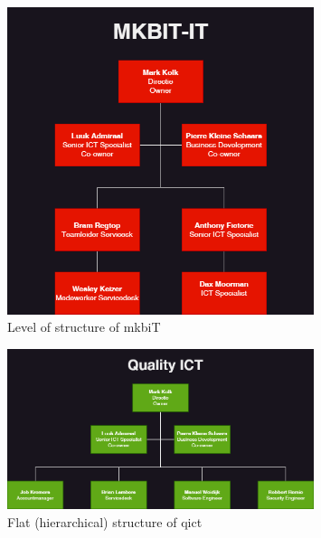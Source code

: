 \begin{figure}[htbp]
      \centering
      \includegraphics[width=0.8\textwidth]{Figures/Organogram-MKBiT.png}
      \caption{Level of structure of \acrshort{mkb}iT}
\end{figure}

\begin{figure}[htbp]
      \centering
      \includegraphics[width=0.8\textwidth]{Figures/OrganizationalDiagram_QICT.png}
      \caption{Flat (hierarchical) structure of \acrshort{qict}}
\end{figure}